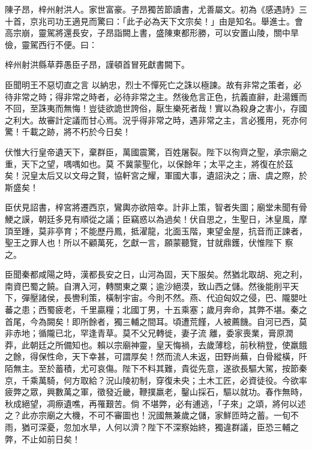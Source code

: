 \begin{pinyinscope}
 陳子昂，梓州射洪人。家世富豪。子昂獨苦節讀書，尤善屬文。初為《感遇詩》三十首，京兆司功王適見而驚曰：「此子必為天下文宗矣！」由是知名。舉進士。會高宗崩，靈駕將還長安，子昂詣闕上書，盛陳東都形勝，可以安置山陵，關中旱儉，靈駕西行不便。曰：



 梓州射洪縣草莽愚臣子昂，謹頓首冒死獻書闕下。



 臣聞明王不惡切直之言
 以納忠，烈士不憚死亡之誅以極諫。故有非常之策者，必待非常之時；得非常之時者，必待非常之主。然後危言正色，抗義直辭，赴湯鑊而不回，至誅夷而無悔！豈徒欲詭世誇俗，厭生樂死者哉！實以為殺身之害小，存國之利大。故審計定議而甘心焉。況乎得非常之時，遇非常之主，言必獲用，死亦何驚！千載之跡，將不朽於今日矣！



 伏惟大行皇帝遺天下，棄群臣，萬國震驚，百姓屠裂。陛下以徇齊之聖，承宗廟之重，天下之望，喁喁如也。莫
 不冀蒙聖化，以保餘年；太平之主，將復在於茲矣！況皇太后又以文母之賢，協軒宮之耀，軍國大事，遺詔決之；唐、虞之際，於斯盛矣！



 臣伏見詔書，梓宮將遷西京，鸞輿亦欲陪幸。計非上策，智者失圖；廟堂未聞有骨鯁之謨，朝廷多見有順從之議；臣竊惑以為過矣！伏自思之，生聖日，沐皇風，摩頂至踵，莫非亭育；不能歷丹鳳，抵濯龍，北面玉階，東望金屋，抗音而正諫者，聖王之罪人也！所以不顧萬死，乞獻一言，願蒙聽覽，甘就鼎鑊，伏惟陛下
 察之。



 臣聞秦都咸陽之時，漢都長安之日，山河為固，天下服矣。然猶北取胡、宛之利，南資巴蜀之饒。自渭入河，轉關東之粟；逾沙絕漠，致山西之儲。然後能削平天下，彈壓諸侯，長轡利策，橫制宇宙。今則不然。燕、代迫匈奴之侵，巴、隴嬰吐蕃之患；西蜀疲老，千里贏糧；北國丁男，十五乘塞；歲月奔命，其弊不堪。秦之首尾，今為闕矣！即所餘者，獨三輔之間耳。頃遭荒饉，人被薦饑。自河已西，莫非赤地；循隴已北，罕逢青草。莫不父兄轉徙，妻子流
 離，委家喪業，膏原潤莽，此朝廷之所備知也。賴以宗廟神靈，皇天悔禍，去歲薄稔，前秋稍登，使羸餓之餘，得保性命，天下幸甚，可謂厚矣！然而流人未返，田野尚蕪，白骨縱橫，阡陌無主。至於蓄積，尤可哀傷。陛下不料其難，貴從先意，遂欲長驅大駕，按節秦京，千乘萬騎，何方取給？況山陵初制，穿復未央；土木工匠，必資徒役。今欲率疲弊之眾，興數萬之軍，徵發近畿，鞭撲羸老，鑿山採石，驅以就功。春作無時，秋成絕望，凋瘵遺噍，再罹艱苦。倘
 不堪弊，必有逋逃，「子來」之頌，將何以述之？此亦宗廟之大機，不可不審圖也！況國無兼歲之儲，家鮮匝時之蓄。一旬不雨，猶可深憂，忽加水旱，人何以濟？陛下不深察始終，獨違群議，臣恐三輔之弊，不止如前日矣！




\end{pinyinscope}
